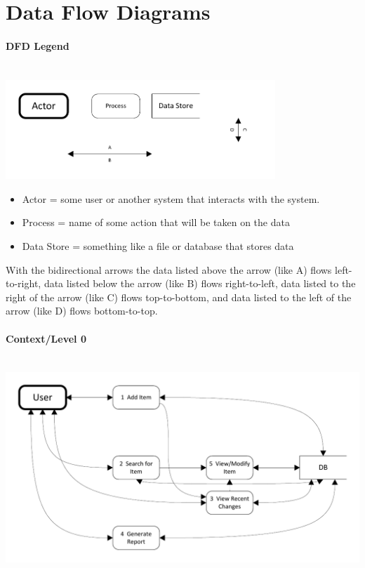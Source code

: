 \documentclass{article}
\begin{document}
\section{Data Flow Diagrams}
\label{dfd}
\paragraph{DFD Legend}
~\\
\includegraphics[keepaspectratio, width=4in]{dfd_legend.pdf}\\
\begin{itemize}
\item Actor = some user or another system that interacts with the system.
\item Process = name of some action that will be taken on the data
\item Data Store = something like a file or database that stores data
\end{itemize}
With the bidirectional arrows the data listed above the arrow (like A) flows left-to-right, data listed below the arrow (like B) flows right-to-left, data listed to the right of the arrow (like C) flows top-to-bottom, and data listed to the left of the arrow (like D) flows bottom-to-top.

\paragraph{Context/Level 0}
\label{cfd}
~\\
\includegraphics[keepaspectratio, width=6.5in]{dfd_context_level0.pdf}\\
~\\
\end{document}
